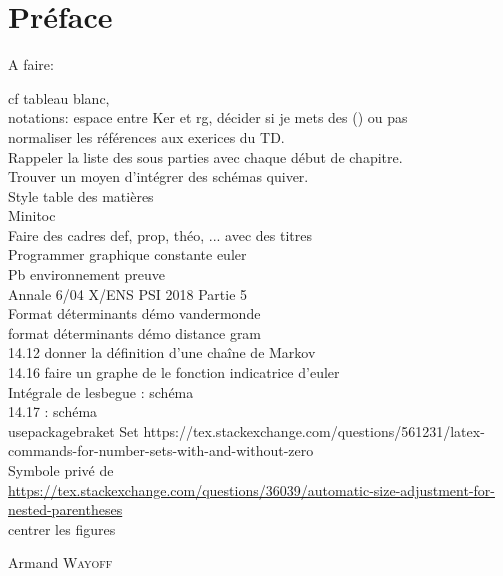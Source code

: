 \pageblanche

\chapter*{Préface}


A faire:

cf tableau blanc, \\
notations: espace entre Ker et rg, décider si je mets des () ou pas \\
normaliser les références aux exerices du TD. \\
Rappeler la liste des sous parties avec chaque début de chapitre. \\
Trouver un moyen d'intégrer des schémas quiver.\\
Style table des matières \\
Minitoc\\
Faire des cadres def, prop, théo, ... avec des titres \\
Programmer graphique constante euler \\
Pb environnement preuve \\
Annale 6/04 X/ENS PSI 2018 Partie 5 \\
Format déterminants démo vandermonde \\
format déterminants démo distance gram \\
14.12 donner la définition d'une chaîne de Markov \\
14.16 faire un graphe de le fonction indicatrice d'euler \\
Intégrale de lesbegue : schéma \\
14.17 : schéma \\
usepackage{braket} Set https://tex.stackexchange.com/questions/561231/latex-commands-for-number-sets-with-and-without-zero \\
Symbole privé de \\
\url{https://tex.stackexchange.com/questions/36039/automatic-size-adjustment-for-nested-parentheses} \\
centrer les figures

\begin{flushright}
	Armand \textsc{Wayoff}
\end{flushright}
